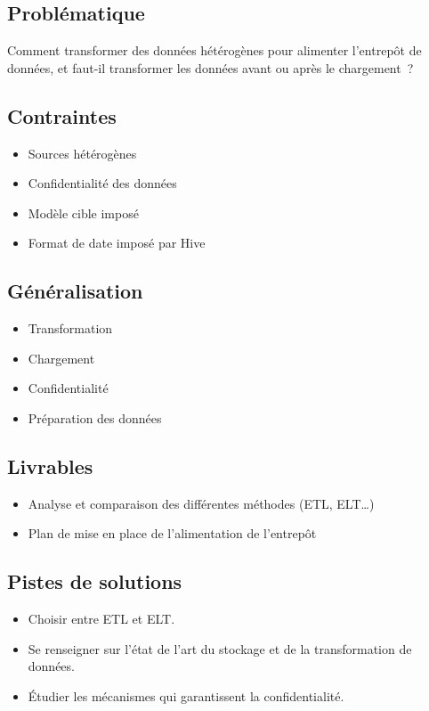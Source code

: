 \subsection*{Problématique}
{}
\noindent Comment transformer des données hétérogènes pour alimenter l'entrepôt de données, et faut-il transformer les données avant ou après le chargement~?

\subsection*{Contraintes}
{}
\begin{itemize}
	\item Sources hétérogènes
	\item Confidentialité des données
	\item Modèle cible imposé
	\item Format de date imposé par Hive
\end{itemize}

\subsection*{Généralisation}
{}
\begin{itemize}
	\item Transformation
	\item Chargement
	\item Confidentialité
	\item Préparation des données
\end{itemize}

\subsection*{Livrables}
{}
\begin{itemize}
	\item Analyse et comparaison des différentes méthodes (ETL, ELT\dots)
	\item Plan de mise en place de l'alimentation de l'entrepôt
\end{itemize}

\subsection*{Pistes de solutions}
{}
\begin{itemize}
	\item Choisir entre ETL et ELT.
	\item Se renseigner sur l'état de l'art du stockage et de la transformation de données.
	\item Étudier les mécanismes qui garantissent la confidentialité.
\end{itemize}

